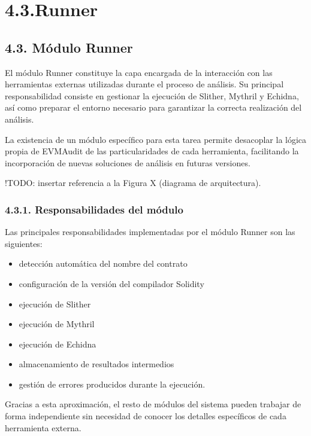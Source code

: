 \section{4.3.Runner}\label{runner}

\subsection{4.3. Módulo Runner}\label{muxf3dulo-runner}

El módulo Runner constituye la capa encargada de la interacción con las
herramientas externas utilizadas durante el proceso de análisis. Su
principal responsabilidad consiste en gestionar la ejecución de Slither,
Mythril y Echidna, así como preparar el entorno necesario para
garantizar la correcta realización del análisis.

La existencia de un módulo específico para esta tarea permite desacoplar
la lógica propia de EVMAudit de las particularidades de cada
herramienta, facilitando la incorporación de nuevas soluciones de
análisis en futuras versiones.

!TODO: insertar referencia a la Figura X (diagrama de arquitectura).

\subsubsection{4.3.1. Responsabilidades del
módulo}\label{responsabilidades-del-muxf3dulo}

Las principales responsabilidades implementadas por el módulo Runner son
las siguientes:

\begin{itemize}
\tightlist
\item
  detección automática del nombre del contrato
\item
  configuración de la versión del compilador Solidity
\item
  ejecución de Slither
\item
  ejecución de Mythril
\item
  ejecución de Echidna
\item
  almacenamiento de resultados intermedios
\item
  gestión de errores producidos durante la ejecución.
\end{itemize}

Gracias a esta aproximación, el resto de módulos del sistema pueden
trabajar de forma independiente sin necesidad de conocer los detalles
específicos de cada herramienta externa.


